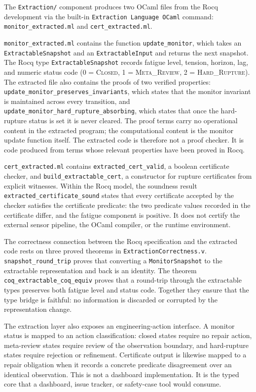 \documentclass[a4paper,11pt]{article}
\begin{document}
The \texttt{Extraction/} component produces two OCaml files from the Rocq
development via the built-in \texttt{Extraction Language OCaml} command:
\texttt{monitor\_extracted.ml} and \texttt{cert\_extracted.ml}.

\texttt{monitor\_extracted.ml} contains the function \texttt{update\_monitor},
which takes an \texttt{ExtractableSnapshot} and an \texttt{ExtractableInput}
and returns the next snapshot. The Rocq type \texttt{ExtractableSnapshot}
records fatigue level, tension, horizon, lag, and numeric status code (0 =
\textsc{Closed}, 1 = \textsc{Meta\_Review}, 2 = \textsc{Hard\_Rupture}). The
extracted file also contains the proofs of two verified properties:
\texttt{update\_monitor\_preserves\_invariants}, which states that the monitor
invariant is maintained across every transition, and
\texttt{update\_monitor\_hard\_rupture\_absorbing}, which states that once the
hard-rupture status is set it is never cleared. The proof terms carry no
operational content in the extracted program; the computational content is the
monitor update function itself. The extracted code is therefore not a proof
checker. It is code produced from terms whose relevant properties have been
proved in Rocq.

\texttt{cert\_extracted.ml} contains \texttt{extracted\_cert\_valid}, a
boolean certificate checker, and \texttt{build\_extractable\_cert}, a
constructor for rupture certificates from explicit witnesses. Within the Rocq model, the soundness result
\texttt{extracted\_certificate\_sound} states that every certificate accepted
by the checker satisfies the certificate predicate: the two predicate values
recorded in the certificate differ, and the fatigue component is positive. It
does not certify the external sensor pipeline, the OCaml compiler, or the
runtime environment.

The correctness connection between the Rocq specification and the extracted
code rests on three proved theorems in \texttt{ExtractionCorrectness.v}.
\texttt{snapshot\_round\_trip} proves that converting a \texttt{MonitorSnapshot}
to the extractable representation and back is an identity. The theorem
\texttt{coq\_extractable\_coq\_equiv} proves that a round-trip through the
extractable types preserves both fatigue level and status code. Together they ensure that the type bridge is faithful: no information is
discarded or corrupted by the representation change.

The extraction layer also exposes an engineering-action interface.  A monitor
status is mapped to an action classification: closed states require no repair
action, meta-review states require review of the observation boundary, and
hard-rupture states require rejection or refinement.  Certificate output is
likewise mapped to a repair obligation when it records a concrete predicate
disagreement over an identical observation.  This is not a dashboard
implementation.  It is the typed core that a dashboard, issue tracker, or
safety-case tool would consume.
\end{document}
